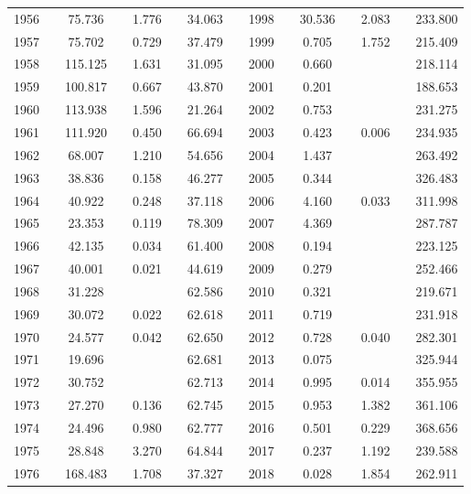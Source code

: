 \begin{landscape}
\begin{table}[]
\begin{tabular}{clccccccclccccc}
1956 &  & 75.736 &  & 1.776 &  & 34.063 &  & 1998 &  & 30.536 &  & 2.083 &  & 233.800 \\
1957 &  & 75.702 &  & 0.729 &  & 37.479 &  & 1999 &  & 0.705 &  & 1.752 &  & 215.409 \\
1958 &  & 115.125 &  & 1.631 &  & 31.095 &  & 2000 &  & 0.660 &  &  &  & 218.114 \\
1959 &  & 100.817 &  & 0.667 &  & 43.870 &  & 2001 &  & 0.201 &  &  &  & 188.653 \\
1960 &  & 113.938 &  & 1.596 &  & 21.264 &  & 2002 &  & 0.753 &  &  &  & 231.275 \\
1961 &  & 111.920 &  & 0.450 &  & 66.694 &  & 2003 &  & 0.423 &  & 0.006 &  & 234.935 \\
1962 &  & 68.007 &  & 1.210 &  & 54.656 &  & 2004 &  & 1.437 &  &  &  & 263.492 \\
1963 &  & 38.836 &  & 0.158 &  & 46.277 &  & 2005 &  & 0.344 &  &  &  & 326.483 \\
1964 &  & 40.922 &  & 0.248 &  & 37.118 &  & 2006 &  & 4.160 &  & 0.033 &  & 311.998 \\
1965 &  & 23.353 &  & 0.119 &  & 78.309 &  & 2007 &  & 4.369 &  &  &  & 287.787 \\
1966 &  & 42.135 &  & 0.034 &  & 61.400 &  & 2008 &  & 0.194 &  &  &  & 223.125 \\
1967 &  & 40.001 &  & 0.021 &  & 44.619 &  & 2009 &  & 0.279 &  &  &  & 252.466 \\
1968 &  & 31.228 &  &  &  & 62.586 &  & 2010 &  & 0.321 &  &  &  & 219.671 \\
1969 &  & 30.072 &  & 0.022 &  & 62.618 &  & 2011 &  & 0.719 &  &  &  & 231.918 \\
1970 &  & 24.577 &  & 0.042 &  & 62.650 &  & 2012 &  & 0.728 &  & 0.040 &  & 282.301 \\
1971 &  & 19.696 &  &  &  & 62.681 &  & 2013 &  & 0.075 &  &  &  & 325.944 \\
1972 &  & 30.752 &  &  &  & 62.713 &  & 2014 &  & 0.995 &  & 0.014 &  & 355.955 \\
1973 &  & 27.270 &  & 0.136 &  & 62.745 &  & 2015 &  & 0.953 &  & 1.382 &  & 361.106 \\
1974 &  & 24.496 &  & 0.980 &  & 62.777 &  & 2016 &  & 0.501 &  & 0.229 &  & 368.656 \\
1975 &  & 28.848 &  & 3.270 &  & 64.844 &  & 2017 &  & 0.237 &  & 1.192 &  & 239.588 \\
1976 &  & 168.483 &  & 1.708 &  & 37.327 &  & 2018 &  & 0.028 &  & 1.854 &  & 262.911 \\

\end{tabular}
\end{table}
\end{landscape}
